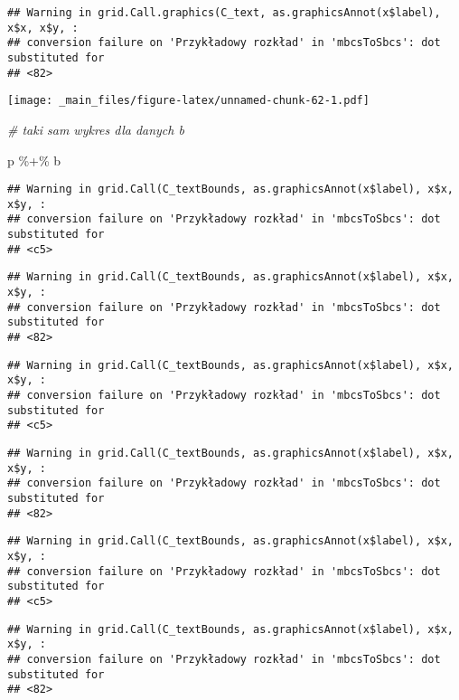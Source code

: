 \documentclass[
]{book}
\newenvironment{Shaded}{\begin{snugshade}}{\end{snugshade}}
\newcommand{\CommentTok}[1]{\textcolor[rgb]{0.56,0.35,0.01}{\textit{#1}}}
\newcommand{\NormalTok}[1]{#1}
\newcommand{\SpecialCharTok}[1]{\textcolor[rgb]{0.00,0.00,0.00}{#1}}
\begin{document}
\begin{verbatim}
## Warning in grid.Call.graphics(C_text, as.graphicsAnnot(x$label), x$x, x$y, :
## conversion failure on 'Przykładowy rozkład' in 'mbcsToSbcs': dot substituted for
## <82>
\end{verbatim}

\texttt{[image: \_main\_files/figure-latex/unnamed-chunk-62-1.pdf]}

\begin{Shaded}
\begin{Highlighting}[]
\CommentTok{\# taki sam wykres dla danych b}

\NormalTok{p }\SpecialCharTok{\%+\%}\NormalTok{ b}
\end{Highlighting}
\end{Shaded}

\begin{verbatim}
## Warning in grid.Call(C_textBounds, as.graphicsAnnot(x$label), x$x, x$y, :
## conversion failure on 'Przykładowy rozkład' in 'mbcsToSbcs': dot substituted for
## <c5>
\end{verbatim}

\begin{verbatim}
## Warning in grid.Call(C_textBounds, as.graphicsAnnot(x$label), x$x, x$y, :
## conversion failure on 'Przykładowy rozkład' in 'mbcsToSbcs': dot substituted for
## <82>
\end{verbatim}

\begin{verbatim}
## Warning in grid.Call(C_textBounds, as.graphicsAnnot(x$label), x$x, x$y, :
## conversion failure on 'Przykładowy rozkład' in 'mbcsToSbcs': dot substituted for
## <c5>
\end{verbatim}

\begin{verbatim}
## Warning in grid.Call(C_textBounds, as.graphicsAnnot(x$label), x$x, x$y, :
## conversion failure on 'Przykładowy rozkład' in 'mbcsToSbcs': dot substituted for
## <82>
\end{verbatim}

\begin{verbatim}
## Warning in grid.Call(C_textBounds, as.graphicsAnnot(x$label), x$x, x$y, :
## conversion failure on 'Przykładowy rozkład' in 'mbcsToSbcs': dot substituted for
## <c5>
\end{verbatim}

\begin{verbatim}
## Warning in grid.Call(C_textBounds, as.graphicsAnnot(x$label), x$x, x$y, :
## conversion failure on 'Przykładowy rozkład' in 'mbcsToSbcs': dot substituted for
## <82>
\end{verbatim}
\end{document}
